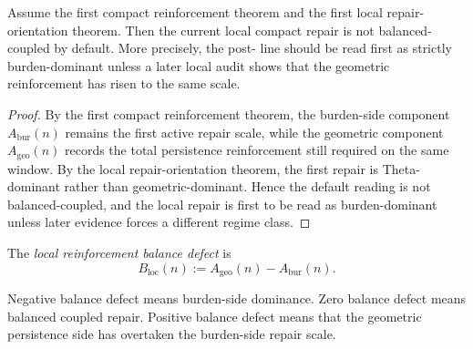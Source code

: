 \begin{proposition}
\label{prop:current-compact-repair-is-not-balanced-by-default}
Assume the first compact reinforcement theorem and the first local repair-orientation theorem.
Then the current local compact repair is not balanced-coupled by default.
More precisely, the post- line should be read first as strictly burden-dominant unless a later local audit shows that the geometric reinforcement has risen to the same scale.
\end{proposition}

\begin{proof}
By the first compact reinforcement theorem, the burden-side component $A_{\mathrm{bur}}(n)$ remains the first active repair scale, while the geometric component $A_{\mathrm{geo}}(n)$ records the total persistence reinforcement still required on the same window.
By the local repair-orientation theorem, the first repair is Theta-dominant rather than geometric-dominant.
Hence the default reading is not balanced-coupled, and the local repair is first to be read as burden-dominant unless later evidence forces a different regime class.
\end{proof}

\begin{definition}
\label{def:local-reinforcement-balance-defect}
The \emph{local reinforcement balance defect} is
\[
 B_{\mathrm{loc}}(n)
 :=
 A_{\mathrm{geo}}(n)-A_{\mathrm{bur}}(n).
\]
\end{definition}

\begin{remark}
\label{rem:interpretation-of-the-balance-defect}
Negative balance defect means burden-side dominance.
Zero balance defect means balanced coupled repair.
Positive balance defect means that the geometric persistence side has overtaken the burden-side repair scale.
\end{remark}

